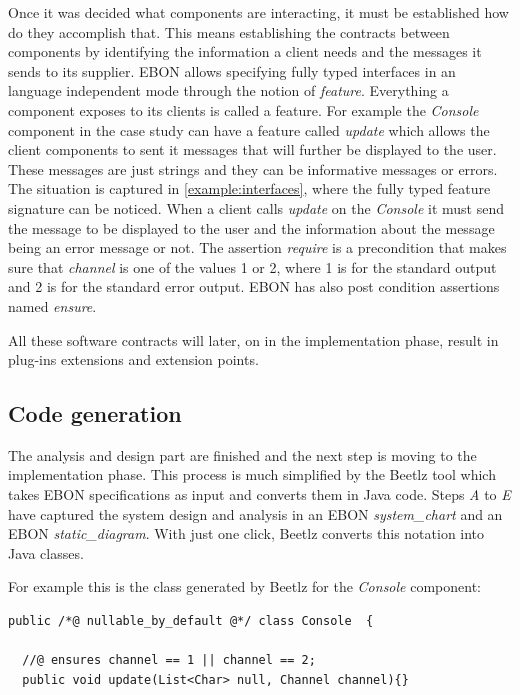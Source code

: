\documentclass[conference]{IEEEtran}
\begin{document}



Once it was decided what components are interacting, it must be
established how do they accomplish that. This means establishing the
contracts between components by identifying the information a client
needs and the messages it sends to its supplier. EBON allows
specifying fully typed interfaces in an language independent mode
through the notion of \emph{feature}. Everything a component exposes
to its clients is called a feature. For example the \emph{Console}
component in the case study can have a feature called \emph{update}
which allows the client components to sent it messages that will
further be displayed to the user. These messages are just strings and
they can be informative messages or errors. The situation is captured
in \autoref{example:interfaces}, where the fully typed feature
signature can be noticed. When a client calls \emph{update} on the
\emph{Console} it must send the message to be displayed to the user
and the information about the message being an error message or not.
The assertion \emph{require} is a precondition that makes sure that
\emph{channel} is one of the values 1 or 2, where 1 is for the
standard output and 2 is for the standard error output. EBON has also
post condition assertions named \emph{ensure}.

All these software contracts will later, on in the implementation phase,
result in plug-ins extensions and extension points.


%
\subsection{Code generation}
\label{sec:code-generation}

The analysis and design part are finished and the next step is moving
to the implementation phase. This process is much simplified by the
Beetlz tool which takes EBON specifications as input and converts them
in Java code. Steps \emph{A} to \emph{E} have captured the system
design and analysis in an EBON \emph{system\_chart} and an EBON
\emph{static\_diagram}. With just one click, Beetlz converts this
notation into Java classes.

For example this is the class generated by Beetlz for the
\emph{Console} component:

\begin{lstlisting}
public /*@ nullable_by_default @*/ class Console  {

  //@ ensures channel == 1 || channel == 2;
  public void update(List<Char> null, Channel channel){}
\end{lstlisting}
\end{document}
